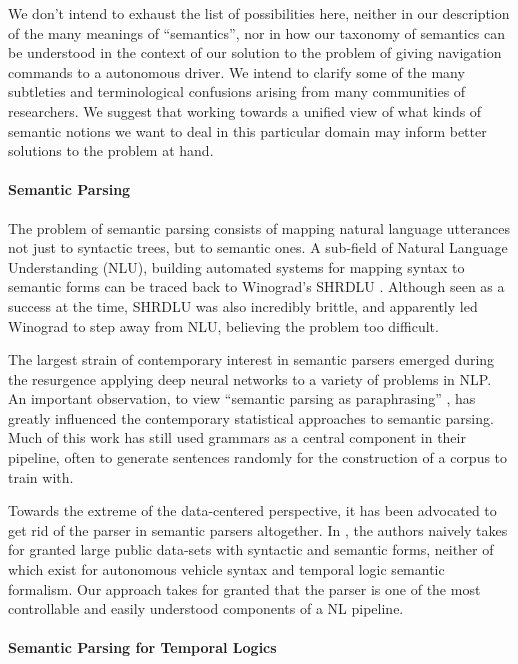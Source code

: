 \documentclass{article}
\begin{document}
We don't intend to exhaust the list of possibilities here, neither in our
description of the many meanings of ``semantics'', nor in how our taxonomy of
semantics can be understood in the context of our solution to the problem of
giving navigation commands to a autonomous driver. We intend to clarify some of
the many subtleties and terminological confusions arising from many
communities of researchers. We suggest that working towards a unified view of
what kinds of semantic notions we want to deal in this particular domain may
inform better solutions to the problem at hand.

\paragraph{Semantic Parsing}

The problem of semantic parsing consists of mapping natural language utterances
not just to syntactic trees, but to semantic ones. A sub-field of Natural
Language Understanding (NLU), building automated systems for mapping syntax to
semantic forms can be traced back to Winograd's SHRDLU
\cite{winograd1971procedures}. Although seen as a success at the time, SHRDLU
was also incredibly brittle, and apparently led Winograd to step away from NLU,
believing the problem too difficult.

The largest strain of contemporary interest in semantic parsers emerged during
the resurgence applying deep neural networks to a variety of problems in NLP.
An important observation, to view ``semantic parsing as paraphrasing''
\cite{berant-liang-2014-semantic}, has greatly influenced the contemporary
statistical approaches to semantic parsing. Much of this work has still used
grammars as a central component in their  pipeline, often to generate sentences
randomly for the construction of a corpus to train with.

Towards the extreme of the data-centered perspective, it has been advocated to
get rid of the parser in semantic parsers altogether. In \cite{dontParse}, the
authors naively takes for granted large public data-sets with syntactic and
semantic forms, neither of which exist for autonomous vehicle syntax and
temporal logic semantic formalism. Our approach takes for granted that the
parser is one of the most controllable and easily understood components of a NL
pipeline.

\paragraph{Semantic Parsing for Temporal Logics}
\end{document}
